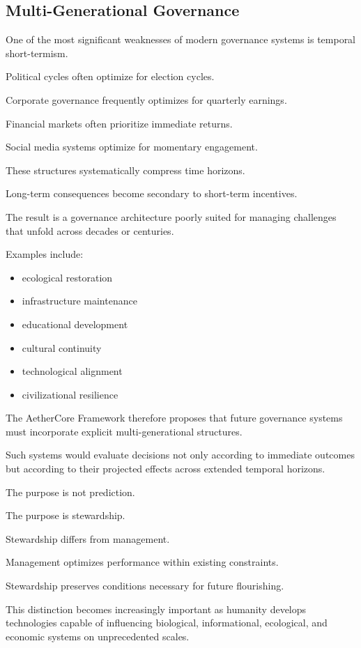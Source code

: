 \documentclass[12pt]{article}
\begin{document}
\subsection{Multi-Generational Governance}

One of the most significant weaknesses of modern governance systems is temporal short-termism.

Political cycles often optimize for election cycles.

Corporate governance frequently optimizes for quarterly earnings.

Financial markets often prioritize immediate returns.

Social media systems optimize for momentary engagement.

These structures systematically compress time horizons.

Long-term consequences become secondary to short-term incentives.

The result is a governance architecture poorly suited for managing challenges that unfold across decades or centuries.

Examples include:

\begin{itemize}
  \item ecological restoration
  \item infrastructure maintenance
  \item educational development
  \item cultural continuity
  \item technological alignment
  \item civilizational resilience
\end{itemize}

The AetherCore Framework therefore proposes that future governance systems must incorporate explicit multi-generational structures.

Such systems would evaluate decisions not only according to immediate outcomes but according to their projected effects across extended temporal horizons.

The purpose is not prediction.

The purpose is stewardship.

Stewardship differs from management.

Management optimizes performance within existing constraints.

Stewardship preserves conditions necessary for future flourishing.

This distinction becomes increasingly important as humanity develops technologies capable of influencing biological, informational, ecological, and economic systems on unprecedented scales.
\end{document}
